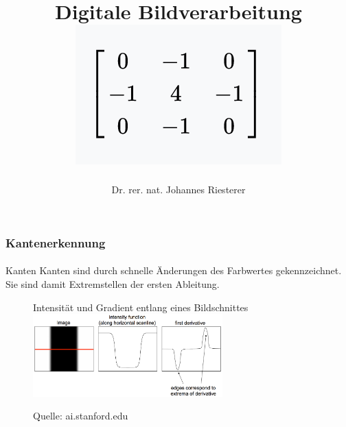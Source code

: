 \documentclass{beamer}
\begin{document}
\title[Digitale Bildverarbeitung] %
{Digitale Bildverarbeitung
\\
\includegraphics[scale=1.0]{img/cover}
}
\subtitle{}
\author[Dr. Johannes Riesterer] %
{Dr.  rer. nat. Johannes Riesterer}

\date[KPT 2004] %
{}

\subject{Digitale Bildverarbeitung}

\frame{\titlepage}


\begin{frame}
    \frametitle{Kantenerkennung}
\framesubtitle{}
\begin{block}{Kanten}
Kanten sind durch schnelle Änderungen des Farbwertes gekennzeichnet. Sie sind damit Extremstellen der ersten Ableitung.
\end{block}
\begin{figure}[htp]
      \centering
Intensität und Gradient entlang eines Bildschnittes \\
    \includegraphics[width=0.65\textwidth]{img/edgedetection} 
      \caption{Quelle: ai.stanford.edu}
\end{figure}

 \end{frame}
\end{document}
